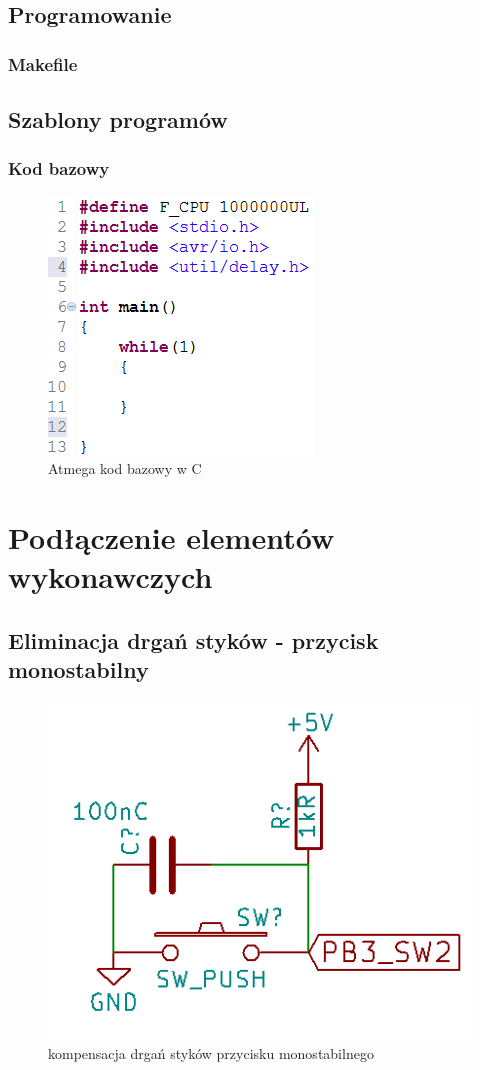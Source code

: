 \documentclass{article}
\begin{document}
\subsection{Programowanie}
\subsubsection{Makefile}

\subsection{Szablony programów}
\subsubsection{Kod bazowy}

\begin{figure}[H]
	\center
	\includegraphics[scale=0.8]{img/kod-bazowy.jpg}
	\caption{Atmega kod bazowy w C}
	\label{fig:img4}
\end{figure}

\section{Podłączenie elementów wykonawczych}
\subsection{Eliminacja drgań styków - przycisk monostabilny}

\begin{figure}[H]
	\center
	\includegraphics[scale=0.8]{img/przycisk-mono.jpg}
	\caption{kompensacja drgań styków przycisku monostabilnego}
	\label{fig:img5}
\end{figure}
\end{document}
